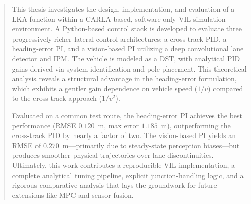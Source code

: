 \begin{abstract}
This thesis investigates the design, implementation, and evaluation of a \ac{LKA} function within a CARLA-based, software-only \ac{VIL} simulation environment. A Python-based control stack is developed to evaluate three progressively richer lateral-control architectures: a cross-track PID, a heading-error PI, and a vision-based PI utilizing a deep convolutional lane detector and \ac{IPM}. The vehicle is modeled as a \ac{DST}, with analytical PID gains derived via system identification and pole placement. This theoretical analysis reveals a structural advantage in the heading-error formulation, which exhibits a gentler gain dependence on vehicle speed ($1/v$) compared to the cross-track approach ($1/v^2$). 

Evaluated on a common test route, the heading-error PI achieves the best performance (\ac{RMSE} $0.120$~m, max error $1.185$~m), outperforming the cross-track PID by nearly a factor of two. The vision-based PI yields an \ac{RMSE} of $0.270$~m—primarily due to steady-state perception biases—but produces smoother physical trajectories over lane discontinuities. Ultimately, this work contributes a reproducible \ac{VIL} implementation, a complete analytical tuning pipeline, explicit junction-handling logic, and a rigorous comparative analysis that lays the groundwork for future extensions like \ac{MPC} and sensor fusion.
\end{abstract}
\acresetall